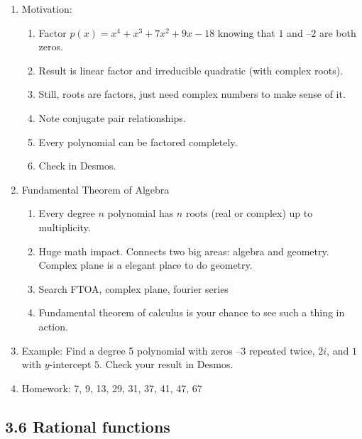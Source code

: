 \documentclass{article}
\begin{document}
\begin{enumerate}
\item Motivation:
\begin{enumerate}
\item Factor $p(x) = x^4+x^3+7x^2+9x-18$ knowing that $1$ and $–2$ are both zeros.
\item Result is linear factor and irreducible quadratic (with complex roots).
\item Still, roots are factors, just need complex numbers to make sense of it.
\item Note conjugate pair relationships.
\item Every polynomial can be factored completely.
\item Check in Desmos.
\end{enumerate}

\item Fundamental Theorem of Algebra
\begin{enumerate}
\item Every degree $n$ polynomial has $n$ roots (real or complex) up to multiplicity.
\item Huge math impact. Connects two big areas: algebra and geometry. Complex plane is a elegant place to do geometry.
\item Search FTOA, complex plane, fourier series
\item Fundamental theorem of calculus is your chance to see such a thing in action.
\end{enumerate}

\item Example: Find a degree 5 polynomial with zeros $–3$ repeated twice, $2i$, and $1$ with $y$-intercept $5$. Check your result in Desmos.

\item Homework: 7, 9, 13, 29, 31, 37, 41, 47, 67

\end{enumerate}


\subsection{3.6 Rational functions}
\end{document}

